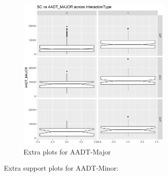 \documentclass[11pt]{scrartcl} %
\begin{document}
\begin{figure}[H]
\begin{minipage}[t]{0.5\linewidth}
\small
\end{minipage}
\begin{minipage}[t]{0.5\linewidth}
\centering
\includegraphics[width=3in]{image/extra4.png}
\small
\end{minipage}
\caption{Extra plots for AADT-Major}
\end{figure}

Extra support plots for AADT-Minor:
\end{document}
